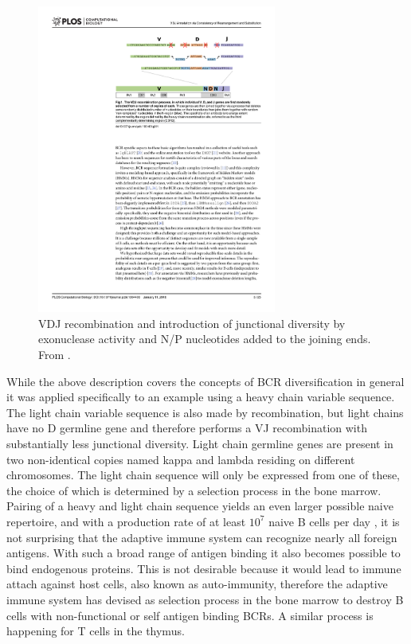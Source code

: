 \begin{figure}
    \centering
    \includegraphics[width=0.7\textwidth]{figures/VDJ_recomb.pdf}
    \caption{
        \label{fig:VDJ_recomb}
        VDJ recombination and introduction of junctional diversity by exonuclease activity and N/P nucleotides added to the joining ends.
        From \cite{ralph2016consistency}.
    }
\end{figure}


While the above description covers the concepts of BCR diversification in general it was applied specifically to an example using a heavy chain variable sequence.
The light chain variable sequence is also made by recombination, but light chains have no D germline gene and therefore performs a VJ recombination with substantially less junctional diversity.
Light chain germline genes are present in two non-identical copies named kappa and lambda residing on different chromosomes.
The light chain sequence will only be expressed from one of these, the choice of which is determined by a selection process in the bone marrow.
Pairing of a heavy and light chain sequence yields an even larger possible naive repertoire, and with a production rate of at least $10^7$ naive B cells per day \cite{murphy2008immunobiology}, it is not surprising that the adaptive immune system can recognize nearly all foreign antigens.
With such a broad range of antigen binding it also becomes possible to bind endogenous proteins.
This is not desirable because it would lead to immune attach against host cells, also known as auto-immunity, therefore the adaptive immune system has devised as selection process in the bone marrow to destroy B cells with non-functional or self antigen binding BCRs.
A similar process is happening for T cells in the thymus.




